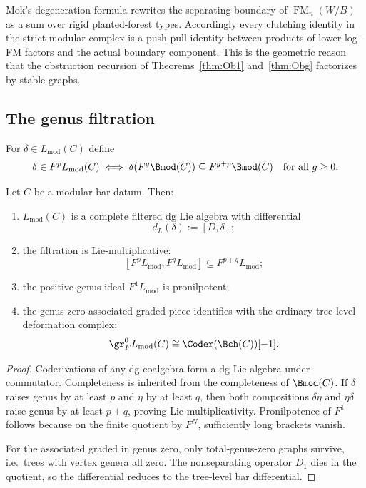 \begin{remark}
\label{rem:vol2-rigid-type-boundary-factorization}
Mok's degeneration formula rewrites the separating boundary of
$\operatorname{FM}_n(W/B)$ as a sum over rigid planted-forest types.
Accordingly every clutching identity in the strict modular complex is a
push-pull identity between products of lower log-FM factors and the actual
boundary component.  This is the geometric reason that the obstruction
recursion of Theorems~\ref{thm:Ob1} and~\ref{thm:Obg} factorizes by stable
graphs.
\end{remark}

\subsection{The genus filtration}

\begin{definition}
For $\delta\in L_{\mathrm{mod}}(C)$ define
\[
\delta\in F^pL_{\mathrm{mod}}(C)
\iff
\delta(F^g\Bmod(C))\subseteq F^{g+p}\Bmod(C)
\quad\text{for all }g\ge 0.
\]
\end{definition}

\begin{theorem}\label{thm:formal-structure}
Let $C$ be a modular bar datum. Then:
\begin{enumerate}[leftmargin=2.4em]
\item $L_{\mathrm{mod}}(C)$ is a complete filtered dg Lie algebra with differential
\[
d_L(\delta):=[D,\delta];
\]
\item the filtration is Lie-multiplicative:
\[
[F^pL_{\mathrm{mod}},F^qL_{\mathrm{mod}}]\subseteq F^{p+q}L_{\mathrm{mod}};
\]
\item the positive-genus ideal $F^1L_{\mathrm{mod}}$ is pronilpotent;
\item the genus-zero associated graded piece identifies with the ordinary tree-level deformation complex:
\[
\gr_F^0 L_{\mathrm{mod}}(C)\cong \Coder(\Bch(C))[-1].
\]
\end{enumerate}
\end{theorem}

\begin{proof}
Coderivations of any dg coalgebra form a dg Lie algebra under commutator. Completeness
is inherited from the completeness of $\Bmod(C)$. If $\delta$ raises genus by at least $p$
and $\eta$ by at least $q$, then both compositions $\delta\eta$ and $\eta\delta$ raise genus
by at least $p+q$, proving Lie-multiplicativity. Pronilpotence of $F^1$ follows because on
the finite quotient by $F^N$, sufficiently long brackets vanish.

For the associated graded in genus zero, only total-genus-zero graphs survive, i.e.\ trees
with vertex genera all zero. The nonseparating operator $D_1$ dies in the quotient, so the
differential reduces to the tree-level bar differential.
\end{proof}

